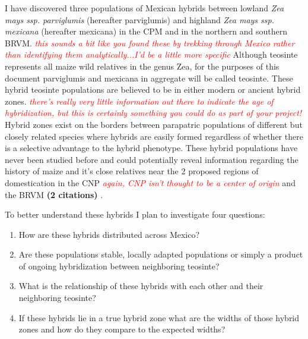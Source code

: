 \documentclass[12pt]{amsart}
\newcommand{\mbh}[1]{\textcolor{red}{ \emph{\scriptsize  #1}} }
\begin{document}
I have discovered three populations of Mexican hybrids between lowland \textit{Zea mays ssp. parviglumis} (hereafter parviglumis) and highland \textit{Zea mays ssp. mexicana} (hereafter mexicana) in the CPM and in the northern and southern BRVM. \mbh{this sounds a bit like you found these by trekking through Mexico rather than identifying them analytically...I'd be a little more specific}
Although teosinte represents all maize wild relatives in the genus {Zea}, for the purposes of this document parviglumis and mexicana in aggregate will be called teosinte.
These hybrid teosinte populations are believed to be in either modern or ancient hybrid zones.  \mbh{there's really very little information out there to indicate the age of hybridization, but this is certainly something you could do as part of your project!}
Hybrid zones exist on the borders between parapatric populations of different but closely related species where hybrids are easily formed regardless of whether there is a selective advantage to the hybrid phenotype.
These hybrid populations have never been studied before and could potentially reveal information regarding the history of maize and it's close relatives near the 2 proposed regions of domestication in the CNP \mbh{again, CNP isn't thought to be a center of origin} and the BRVM \textbf{(2 citations)} .


To better understand these hybrids I plan to investigate four questions: 
\begin{enumerate} 
	\item How are these hybrids distributed across Mexico? 
	\item Are these populations stable, locally adapted populations or simply a product of ongoing hybridization between neighboring teosinte?
	\item What is the relationship of these hybrids with each other and their neighboring teosinte?
	\item If these hybrids lie in a true hybrid zone what are the widths of those hybrid zones and how do they compare to the expected widths?
\end{enumerate} 
\end{document}
